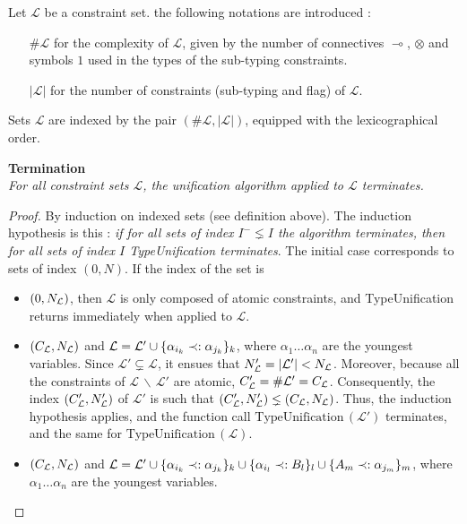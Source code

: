 \begin{defn} Let $\mathcal{L}$ be a constraint set. the following notations are introduced :
	\begin{itemize}
		\item[$\#\mathcal{L}$] for the complexity of $\mathcal{L}$, given by the number of connectives $\multimap$,
			$\otimes$ and symbols $1$ used in the types of the sub-typing constraints.
		\item[$|\mathcal{L}|$] for the number of constraints (sub-typing and flag) of $\mathcal{L}$.
	\end{itemize}
	Sets $\mathcal{L}$ are indexed by the pair $(\#\mathcal{L}, |\mathcal{L}|)$, equipped with the lexicographical order.
\end{defn}

\begin{thm}{\bf Termination} \\
	\textit{For all constraint sets $\mathcal{L}$, the unification algorithm applied to $\mathcal{L}$ terminates. }
	\begin{proof}
		By induction on indexed sets (see definition above). The induction hypothesis is this : \textit{if for all sets of index $I^{-} \lneq I$ the
		algorithm terminates, then for all sets of index $I$ TypeUnification terminates}. The initial case corresponds to sets of index $(0, N)$.
		If the index of the set is
		\begin{itemize}
			\item $(0, N_{\mathcal{L}})$, then $\mathcal{L}$ is only composed of atomic constraints, and TypeUnification returns
				immediately when applied to $\mathcal{L}$.
				
			\item $(C_{\mathcal{L}}, N_{\mathcal{L}})$ and $\mathcal{L} = \mathcal{L}' \cup \{ \alpha_{i_k} \prec: \alpha_{j_k} \}_k$, where $\alpha_1 \dots \alpha_n$ are
				the youngest variables. Since $\mathcal{L'} \subsetneq \mathcal{L}$, it ensues that $N_{\mathcal{L}}' = |\mathcal{L'}| < N_{\mathcal{L}}$.
				Moreover, because all the constraints of $\mathcal{L} \,\backslash\, \mathcal{L'}$ are atomic, $C_{\mathcal{L}}' = \#\mathcal{L'} = C_{\mathcal{L}}$.
				Consequently, the index $(C_{\mathcal{L}}', N_{\mathcal{L}}')$ of $\mathcal{L'}$ is such that $(C_{\mathcal{L}}', N_{\mathcal{L}}') \lneq (C_{\mathcal{L}}, N_{\mathcal{L}})$.
				Thus, the induction hypothesis applies, and the function call $\text{TypeUnification}\,(\mathcal{L'})$ terminates, and the same
				for $\text{TypeUnification}\,(\mathcal{L})$.
			
			\item $(C_{\mathcal{L}}, N_{\mathcal{L}})$ and $\mathcal{L} = \mathcal{L}' \cup \{ \alpha_{i_k} \prec: \alpha_{j_k} \}_k \cup \{ \alpha_{i_l} \prec: B_l \}_l
				\cup \{ A_m \prec: \alpha_{j_m} \}_m$, where $\alpha_1 \dots \alpha_n$ are the youngest variables.


\end{itemize}
\end{proof}
\end{thm}
